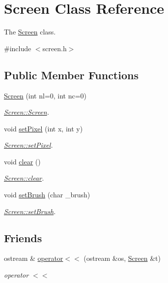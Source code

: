 \hypertarget{classScreen}{}\section{Screen Class Reference}
\label{classScreen}


The \hyperlink{classScreen}{Screen} class.  




{\ttfamily \#include $<$screen.\+h$>$}

\subsection*{Public Member Functions}
\begin{DoxyCompactItemize}
\item 
\hyperlink{classScreen_a071af83b6b9e1bf4a22e912ff0f6de0f}{Screen} (int nl=0, int nc=0)
\begin{DoxyCompactList}\small\item\em \hyperlink{classScreen_a071af83b6b9e1bf4a22e912ff0f6de0f}{Screen\+::\+Screen}. \end{DoxyCompactList}\item 
void \hyperlink{classScreen_ae6bea81c57a22d226507c3c26fa95ee0}{set\+Pixel} (int x, int y)
\begin{DoxyCompactList}\small\item\em \hyperlink{classScreen_ae6bea81c57a22d226507c3c26fa95ee0}{Screen\+::set\+Pixel}. \end{DoxyCompactList}\item 
void \hyperlink{classScreen_a35e74266b2a04e37b354ceff7a5f1031}{clear} ()
\begin{DoxyCompactList}\small\item\em \hyperlink{classScreen_a35e74266b2a04e37b354ceff7a5f1031}{Screen\+::clear}. \end{DoxyCompactList}\item 
void \hyperlink{classScreen_aebc4eb6cb5acf15a0f04c1494622ab23}{set\+Brush} (char \+\_\+brush)
\begin{DoxyCompactList}\small\item\em \hyperlink{classScreen_aebc4eb6cb5acf15a0f04c1494622ab23}{Screen\+::set\+Brush}. \end{DoxyCompactList}\end{DoxyCompactItemize}
\subsection*{Friends}
\begin{DoxyCompactItemize}
\item 
ostream \& \hyperlink{classScreen_aab6a2880746bfe1b7964817cc8f0989e}{operator$<$$<$} (ostream \&os, \hyperlink{classScreen}{Screen} \&t)
\begin{DoxyCompactList}\small\item\em operator $<$$<$ \end{DoxyCompactList}\end{DoxyCompactItemize}


